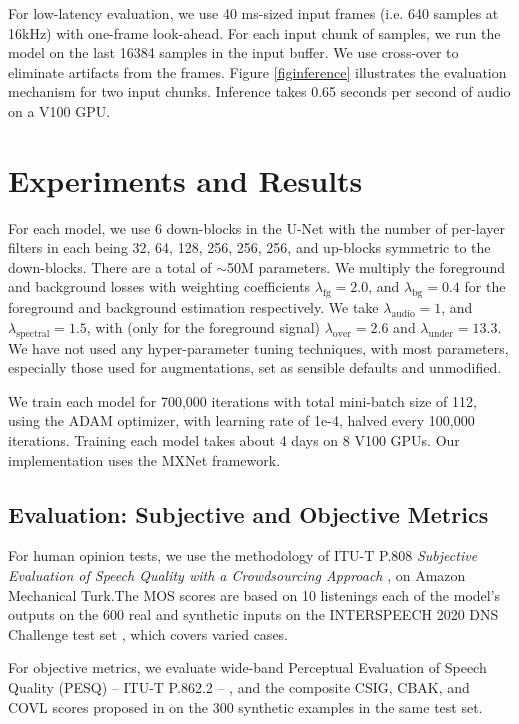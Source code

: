 \documentclass[english]{article}
\begin{document}
For low-latency evaluation, we use 40 ms-sized input frames (i.e. 640 samples at 16kHz) with one-frame look-ahead. For each input chunk of samples, we run the model on the last 16384 samples in the input buffer. We use cross-over to eliminate artifacts from the frames. Figure \ref{figinference} illustrates the evaluation mechanism for two input chunks. Inference takes 0.65 seconds per second of audio on a V100 GPU.




\section{Experiments and Results}

For each model, we use 6 down-blocks in the U-Net with the number of per-layer filters in each being 32, 64, 128, 256, 256, 256, and up-blocks symmetric to the down-blocks. There are a total of $\sim$50M parameters. We multiply the foreground and background losses with weighting coefficients $\lambda_{\text{fg}} = 2.0$, and $\lambda_{\text{bg}} = 0.4$ for the foreground and background estimation respectively. We take $\lambda_{\text{audio}} = 1$, and $\lambda_{\text{spectral}} = 1.5$, with (only for the foreground signal) $\lambda_{\text{over}} = 2.6$ and $\lambda_{\text{under}} = 13.3$. We have not used any hyper-parameter tuning techniques, with most parameters, especially those used for augmentations, set as sensible defaults and unmodified. 

We train each model for 700,000 iterations with total mini-batch size of 112, using the ADAM optimizer, with learning rate of 1e-4, halved every 100,000 iterations. Training each model takes about 4 days on 8 V100 GPUs. Our implementation uses the MXNet \cite{mxnet} framework. 

\subsection{Evaluation: Subjective and Objective Metrics}

For human opinion tests, we use the methodology of ITU-T P.808 \emph{Subjective Evaluation of Speech Quality with a Crowdsourcing Approach} \cite{P.808}, on Amazon Mechanical Turk.The MOS scores are based on 10 listenings each of the model's outputs on the 600 real and synthetic inputs on the INTERSPEECH 2020 DNS Challenge test set \cite{dnschallengefinal}, which covers varied cases.  

For objective metrics, we evaluate wide-band Perceptual Evaluation of Speech Quality (PESQ) -- ITU-T P.862.2 -- \cite{P.862}, and the composite CSIG, CBAK, and COVL scores proposed in \cite{loizou2007speech} on the 300 synthetic examples in the same test set.
\end{document}

